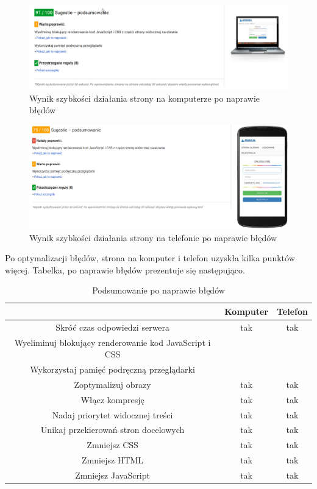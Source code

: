 \documentclass[openright]{xmgr}
\begin{document}
	
	\begin{figure}[!tbh]
		\centering
		\includegraphics[width=\linewidth]{image/komp}
		\caption{Wynik szybkości działania strony na komputerze po naprawie błędów}
	\end{figure}
	
	\begin{figure}[!tbh]
		\centering
		\includegraphics[width=\linewidth]{image/teltest}
		\caption{Wynik szybkości działania strony na telefonie po naprawie błędów}
	\end{figure}
	\newpage
	
	Po optymalizacji błędów, strona na komputer i telefon uzyskła kilka punktów więcej. Tabelka, po naprawie błędów prezentuje się następująco. 
	
	\begin{table} [!h]
		\centering
		\begin{footnotesize}
			\caption{Podsumowanie po naprawie błędów}
			\begin{tabular}{|c|c|c|}
				\hline  & Komputer  & Telefon \\ 
				\hline  Skróć czas odpowiedzi serwera & tak & tak \\ 
				\hline  Wyeliminuj blokujący renderowanie kod JavaScript i CSS &  &  \\ 
				\hline Wykorzystaj pamięć podręczną przeglądarki &  &  \\ 
				\hline Zoptymalizuj obrazy & tak & tak \\ 
				\hline Włącz kompresję & tak & tak \\ 
				\hline Nadaj priorytet widocznej treści & tak & tak \\ 
				\hline Unikaj przekierowań stron docelowych & tak & tak \\ 
				\hline Zmniejsz CSS & tak & tak \\ 
				\hline Zmniejsz HTML & tak & tak \\ 
				\hline Zmniejsz JavaScript & tak & tak \\ 
				\hline 
			\end{tabular} 
		\end{footnotesize}
	\end{table}
	
\end{document}
